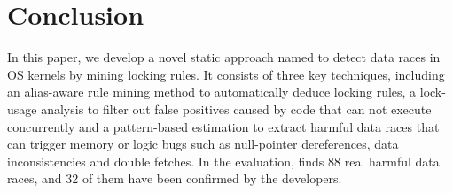 \section{Conclusion}
\label{sec_conclusion}

In this paper, we develop a novel static approach named \sys to detect data 
races in OS kernels by mining locking rules. It consists of three key 
techniques, including an alias-aware rule mining method to automatically deduce 
locking rules, a lock-usage analysis to filter out false positives caused by 
code that can not execute concurrently and a pattern-based estimation to 
extract harmful data races that can trigger memory or logic bugs such as 
null-pointer dereferences, data inconsistencies and double fetches. In the 
evaluation, \sys finds 88 real harmful data races, and 32 of them have been 
confirmed by the developers.